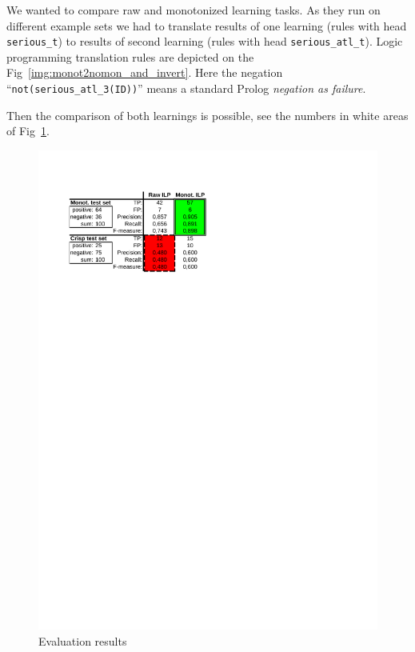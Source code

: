 \documentclass[authoryear,12pt]{elsarticle}
\begin{document}
We wanted to compare raw and monotonized learning tasks. As they run on different example sets we had to translate results of one learning (rules with head \texttt{serious\_t}) to results of second learning (rules with head \texttt{serious\_atl\_t}). Logic programming translation rules are depicted on the Fig~\ref{img:monot2nomon_and_invert}. Here the negation ``\texttt{not(serious\_atl\_3(ID))}'' means a standard Prolog \emph{negation as failure}. 

Then the comparison of both learnings is possible, see the numbers in white areas of Fig~\ref{img:evaluation}.


\begin{figure}[ht]
\begin{minipage}[b]{0.5\hsize}
	\centering
		\includegraphics[width=\hsize]{img/Evaluation}
\caption{Evaluation results}
\label{img:evaluation}
\end{minipage}

\end{figure}
\end{document}
